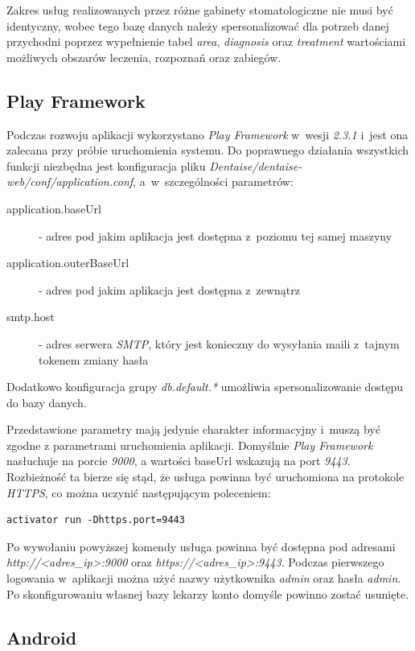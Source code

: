 \documentclass[11pt]{aghdpl}
\begin{document}
Zakres usług realizowanych przez różne gabinety stomatologiczne nie musi być identyczny, wobec tego bazę danych należy spersonalizować dla potrzeb danej przychodni poprzez wypełnienie tabel \emph{area}, \emph{diagnosis} oraz \emph{treatment} wartościami możliwych obszarów leczenia, rozpoznań oraz zabiegów.

\subsection{Play Framework}
\label{sec:playFramework}

Podczas rozwoju aplikacji wykorzystano \emph{Play Framework} w~wesji \emph{2.3.1} i~jest ona zalecana przy próbie uruchomienia systemu. Do poprawnego działania wszystkich funkcji niezbędna jest konfiguracja pliku \emph{Dentaise/dentaise-web/conf/application.conf}, a~w~szczególności parametrów:
\begin{description}
\item[application.baseUrl] - adres pod jakim aplikacja jest dostępna z~poziomu tej samej maszyny
\item[application.outerBaseUrl] - adres pod jakim aplikacja jest dostępna z~zewnątrz
\item[smtp.host] - adres serwera \emph{SMTP}, który jest konieczny do wysyłania maili z~tajnym tokenem zmiany hasła
\end{description}
Dodatkowo konfiguracja grupy \emph{db.default.*} umożliwia spersonalizowanie dostępu do bazy danych.

Przedstawione parametry mają jedynie charakter informacyjny i~muszą być zgodne z parametrami uruchomienia aplikacji. Domyślnie \emph{Play Framework} nasłuchuje na porcie \emph{9000}, a wartości baseUrl wskazują na port \emph{9443}. Rozbieżność ta bierze się stąd, że usługa powinna być uruchomiona na protokole \emph{HTTPS}, co można uczynić następującym poleceniem:

\begin{lstlisting}
activator run -Dhttps.port=9443
\end{lstlisting}

Po wywołaniu powyższej komendy usługa powinna być dostępna pod adresami \emph{http://<adres\_ip>:9000} oraz \emph{https://<adres\_ip>:9443}. Podczas pierwszego logowania w~aplikacji można użyć nazwy użytkownika \emph{admin} oraz hasła \emph{admin}. Po skonfigurowaniu własnej bazy lekarzy konto domyśle powinno zostać usunięte.

\subsection{Android}
\end{document}
